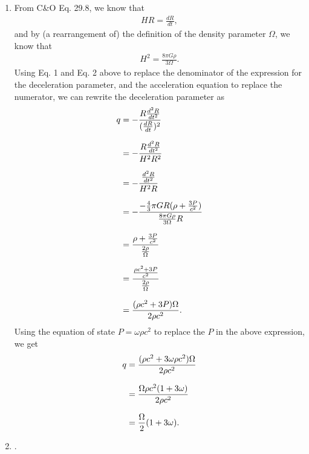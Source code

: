 \documentclass[11pt,letterpaper]{article}
\begin{document}
\begin{enumerate}[label=(\roman*)]
    \item From C\&O Eq. 29.8, we know that 
        \begin{align}
            HR = \frac{dR}{dt},
        \end{align}
        and by (a rearrangement of) the definition of the density parameter $\Omega$, we know that 
        \begin{align}
            H^2 = \frac{8\pi G\rho}{3\Omega}.
        \end{align}
        Using Eq. 1 and Eq. 2 above to replace the denominator of the expression for the deceleration parameter, and the acceleration equation to replace the numerator, we can rewrite the deceleration parameter as 
        \begin{equation*}
        \setlength{\jot}{10pt}
            \begin{align*}
                q &= -\frac{R\frac{d^2R}{dt^2}}{(\frac{dR}{dt})^2} \\
                &= -\frac{R\frac{d^2R}{dt^2}}{H^2R^2} \\
                &= -\frac{\frac{d^2R}{dt^2}}{H^2R} \\
                &= -\frac{-\frac{4}{3}\pi GR(\rho + \frac{3P}{c^2})}{\frac{8\pi G\rho}{3\Omega}R} \\
                &= \frac{\rho + \frac{3P}{c^2}}{\frac{2\rho}{\Omega}} \\
                &= \frac{\frac{\rho c^2 + 3P}{c^2}}{\frac{2\rho}{\Omega}} \\
                &= \frac{(\rho c^2 + 3P)\Omega}{2\rho c^2}.
            \end{align*}
        \end{equation*}
        Using the equation of state $P=\omega \rho c^2$ to replace the $P$ in the above expression, we get 
        \begin{equation*}
        \setlength{\jot}{10pt}
            \begin{align*}
                q &= \frac{(\rho c^2 + 3\omega \rho c^2)\Omega}{2\rho c^2} \\
                &= \frac{\Omega\rho c^2(1+3\omega)}{2\rho c^2} \\
                &= \frac{\Omega}{2}(1+3\omega). 
            \end{align*}
        \end{equation*}

    \item .
\end{enumerate}
\end{document}

